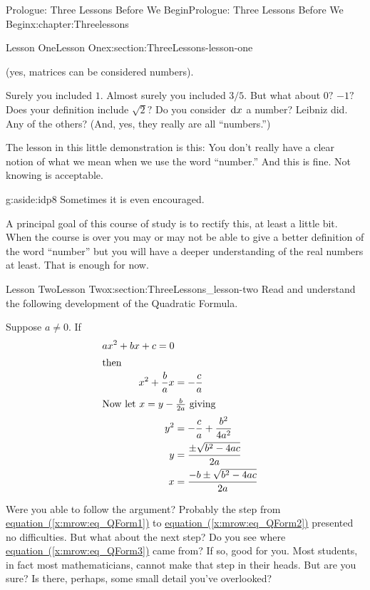 \begin{chapterptx}{Prologue: Three Lessons Before We Begin}{}{Prologue: Three Lessons Before We Begin}{}{}{x:chapter:Threelessons}
\begin{sectionptx}{Lesson One}{}{Lesson One}{}{}{x:section:ThreeLessons-lesson-one}
\begin{itemize}[label=\textbullet]
\begin{pmatrix}
			\end{pmatrix}\) (yes, matrices can be considered numbers).%
		\end{itemize}
		\par
		Surely you included \(1\). Almost surely you included \(3/5\). But what about \(0?\) \(-1?\) Does your definition include \(\sqrt{2}?\) Do you consider \(\,{\rm d}x\) a number? Leibniz did. Any of the others? (And, yes, they really are all ``numbers.'')%
		\par
		The lesson in this little demonstration is this: You don't really have a clear notion of what we mean when we use the word ``number.'' And this is fine. Not knowing  is acceptable.%
		\begin{aside}{}{g:aside:idp8}%
			Sometimes it is even encouraged.%
		\end{aside}
		A principal goal of this  course of study is to rectify this, at least a little bit. When the course is over you may or may not be able to give a better definition of the word ``number'' but you will have a deeper understanding of the real numbers at least. That is enough for now.%
	\end{sectionptx}
	\typeout{************************************************}
	\typeout{************************************************}
	\begin{sectionptx}{Lesson Two}{}{Lesson Two}{}{}{x:section:ThreeLessons_lesson-two}
		Read and understand the following development of the Quadratic Formula.%
		\par
		Suppose \(a\neq0\). If%
		\begin{align}
			ax^2+bx+c =0\label{x:mrow:eq_QForm1}\\
			\intertext{then}
			x^2+\frac{b}{a}x& =-\frac{c}{a}\label{x:mrow:eq_QForm2}\\
			\intertext{Now let \(x=y-\frac{b}{2a}\) giving}
			y^2& = -\frac{c}{a} +\frac{b^2}{4a^2}\label{x:mrow:eq_QForm3}\\
			y& = \frac{\pm \sqrt{b^2-4ac}}{2a}\label{g:mrow:idp9}\\
			x& = \frac{-b\pm\sqrt{b^2-4ac}}{2a}\label{x:mrow:eq_QForm4}
		\end{align}
		\par
		Were you able to follow the argument? Probably the step from \hyperref[x:mrow:eq_QForm1]{equation~({\xreffont\ref{x:mrow:eq_QForm1}})} to \hyperref[x:mrow:eq_QForm2]{equation~({\xreffont\ref{x:mrow:eq_QForm2}})} presented no difficulties. But what about the next step? Do you see where \hyperref[x:mrow:eq_QForm3]{equation~({\xreffont\ref{x:mrow:eq_QForm3}})} came from? If so, good for you. Most students, in fact most mathematicians, cannot make that step in their heads. But are you sure? Is there, perhaps, some small detail you've overlooked?%

\end{sectionptx}
\end{chapterptx}
